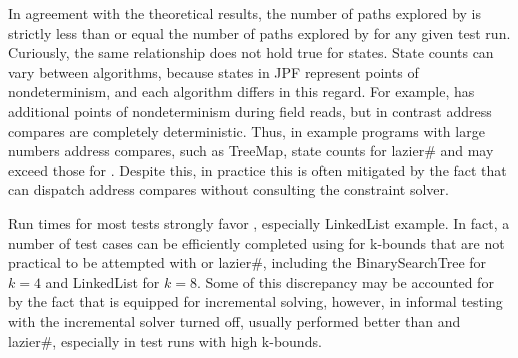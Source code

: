 In agreement with the theoretical results, the number of paths explored by \symtxt{} is strictly less than or equal the number of paths explored by \gsetxt{} for any given test run. Curiously, the same relationship does not hold true for states. State counts can vary between algorithms, because states in JPF represent points of nondeterminism, and each algorithm differs in this regard. For example, \gsetxt{} has additional points of nondeterminism during field reads, but in contrast address compares are completely deterministic. Thus, in example programs with large numbers address compares, such as TreeMap, state counts for lazier\# and \symtxt{} may exceed those for \gsetxt{}. Despite this, in practice this is often mitigated by the fact that \symtxt{} can dispatch address compares without consulting the constraint solver.

Run times for most tests strongly favor \symtxt{}, especially LinkedList example. In fact, a number of test cases can be efficiently completed using \symtxt{} for k-bounds that are not practical to be attempted with \gsetxt{} or lazier\#, including the BinarySearchTree for $k=4$ and LinkedList for $k=8$. Some of this discrepancy may be accounted for by the fact that \symtxt{} is equipped for incremental solving, however, in informal testing with the incremental solver turned off, \symtxt{} usually performed better than \gsetxt and lazier\#, especially in test runs with high k-bounds. 




